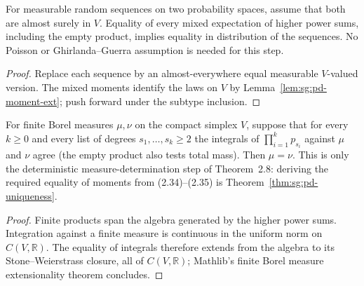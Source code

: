\begin{lemma}
\label{lem:sg:pd-random-moment-ext}
  \leanok
For measurable random sequences on two probability spaces, assume that both
are almost surely in $V$. Equality of every mixed expectation of higher power
sums, including the empty product, implies equality in distribution of the
sequences. No Poisson or Ghirlanda--Guerra assumption is needed for this step.
\end{lemma}
\begin{proof}
  \leanok
Replace each sequence by an almost-everywhere equal measurable $V$-valued
version. The mixed moments identify the laws on $V$ by
Lemma~\ref{lem:sg:pd-moment-ext}; push forward under the subtype inclusion.
\end{proof}

\begin{lemma}\label{lem:sg:pd-moment-ext}
  \leanok
For finite Borel measures $\mu,\nu$ on the compact simplex $V$, suppose that for every $k\ge0$ and every list of degrees $s_1,\ldots,s_k\ge2$ the integrals of $\prod_{i=1}^k p_{s_i}$ against $\mu$ and $\nu$ agree (the empty product also tests total mass). Then $\mu=\nu$. This is only the deterministic measure-determination step of Theorem~2.8: deriving the required equality of moments from (2.34)--(2.35) is Theorem~\ref{thm:sg:pd-uniqueness}.
\end{lemma}
\begin{proof}
  \leanok
Finite products span the algebra generated by the higher power sums. Integration against a finite measure is continuous in the uniform norm on $C(V,\mathbb R)$. The equality of integrals therefore extends from the algebra to its Stone--Weierstrass closure, all of $C(V,\mathbb R)$; Mathlib's finite Borel measure extensionality theorem concludes.
\end{proof}

